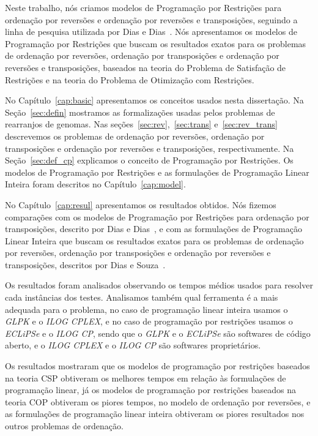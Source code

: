 Neste trabalho, nós criamos modelos de Programação por Restrições para
ordenação por reversões e ordenação por reversões e transposições,
seguindo a linha de pesquisa utilizada por Dias e
Dias~\cite{DiasDias*2009}. Nós apresentamos os modelos de Programação
por Restrições que buscam os resultados exatos para os problemas de
ordenação por reversões, ordenação por transposições e ordenação por
reversões e transposições, baseados na teoria do Problema de Satisfação
de Restrições e na teoria do Problema de Otimização com Restrições.

No Capítulo~\ref{cap:basic} apresentamos os conceitos usados nesta
dissertação. Na Seção~\ref{sec:defin} mostramos as formalizações usadas
pelos problemas de rearranjos de genomas. Nas
seções~\ref{sec:rev},~\ref{sec:trans} e~\ref{sec:rev_trans} descrevemos
os problemas de ordenação por reversões, ordenação por transposições e
ordenação por reversões e transposições, respectivamente. Na
Seção~\ref{sec:def_cp} explicamos o conceito de Programação por
Restrições. Os modelos de Programação por Restrições e as formulações de
Programação Linear Inteira foram descritos no Capítulo~\ref{cap:model}.

No Capítulo~\ref{cap:resul} apresentamos os resultados obtidos. Nós
fizemos comparações com os modelos de Programação por Restrições para
ordenação por transposições, descrito por Dias e
Dias~\cite{DiasDias*2009}, e com as formulações de Programação Linear
Inteira que buscam os resultados exatos para os problemas de ordenação
por reversões, ordenação por transposições e ordenação por reversões e
transposições, descritos por Dias e Souza~\cite{DiasSouza*2007}.

Os resultados foram analisados observando os tempos médios usados para
resolver cada instâncias dos testes. Analisamos também qual ferramenta
é a mais adequada para o problema, no caso de programação linear
inteira usamos o \textit{GLPK} e o \textit{ILOG CPLEX}, e no caso de
programação por restrições usamos o \textit{ECLiPSe} e o \textit{ILOG
CP}, sendo que o \textit{GLPK} e o \textit{ECLiPSe} são softwares de
código aberto, e o \textit{ILOG CPLEX} e o \textit{ILOG CP} são
softwares proprietários.

Os resultados mostraram que os modelos de programação por restrições
baseados na teoria CSP obtiveram os melhores tempos em relação às
formulações de programação linear, já os modelos de programação por
restrições baseados na teoria COP obtiveram os piores tempos, no
modelo de ordenação por reversões, e as formulações de programação
linear inteira obtiveram os piores resultados nos outros problemas de
ordenação.

